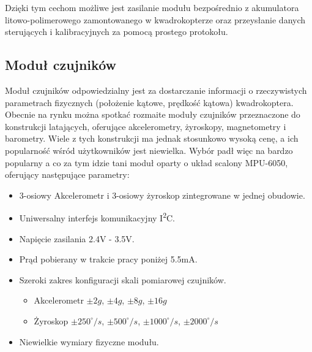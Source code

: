 Dzięki tym cechom możliwe jest zasilanie modułu bezpośrednio z akumulatora litowo-polimerowego zamontowanego w kwadrokopterze oraz przeysłanie danych sterujących i kalibracyjnych za pomocą prostego protokołu.

\subsection{Moduł czujników}
Moduł czujników odpowiedzialny jest za dostarczanie informacji o rzeczywistych parametrach fizycznych (położenie kątowe, prędkość kątowa) kwadrokoptera. Obecnie na rynku można spotkać rozmaite moduły czujników przeznaczone do konstrukcji latających, oferujące akcelerometry, żyroskopy, magnetometry i barometry. Wiele z tych konstrukcji ma jednak stosunkowo wysoką cenę, a ich popularność wśród użytkowników jest niewielka. Wybór padł więc na bardzo popularny a co za tym idzie tani moduł oparty o układ scalony MPU-6050, oferujący następujące parametry:

\begin{itemize}
	\item 3-osiowy Akcelerometr i 3-osiowy żyroskop zintegrowane w jednej obudowie.
	\item Uniwersalny interfejs komunikacyjny I\textsuperscript{2}C.
	\item Napięcie zasilania 2.4V - 3.5V.
	\item Prąd pobierany w trakcie pracy poniżej 5.5mA.
	\item Szeroki zakres konfiguracji skali pomiarowej czujników.
		\begin{itemize}
			\item Akcelerometr $\pm 2g$, $\pm 4g$, $\pm 8g$, $\pm 16g$
			\item Żyroskop $\pm 250^{\circ}/s$, $\pm 500^{\circ}/s$, $\pm 1000^{\circ}/s$, $\pm 2000^{\circ}/s$
		\end{itemize}
	\item Niewielkie wymiary fizyczne modułu.
\end{itemize}

